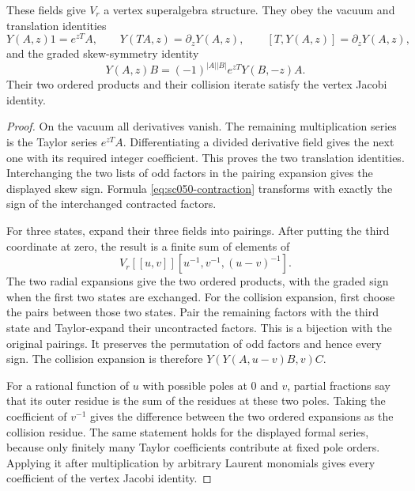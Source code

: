 \begin{proposition}\label{prop:sc050-vertex}
These fields give \(V_r\) a vertex superalgebra structure. They obey
the vacuum and translation identities
\[
 Y(A,z)1=e^{zT}A,\qquad
 Y(TA,z)=\partial_zY(A,z),\qquad
 [T,Y(A,z)]=\partial_zY(A,z),
\]
and the graded skew-symmetry identity
\[
 Y(A,z)B=(-1)^{|A||B|}e^{zT}Y(B,-z)A.
\]
Their two ordered products and their collision iterate satisfy the
vertex Jacobi identity.
\end{proposition}
\begin{proof}
On the vacuum all derivatives vanish. The remaining multiplication
series is the Taylor series \(e^{zT}A\). Differentiating a divided
derivative field gives the next one with its required integer
coefficient. This proves the two translation identities. Interchanging
the two lists of odd factors in the pairing expansion gives the
displayed skew sign. Formula \eqref{eq:sc050-contraction} transforms
with exactly the sign of the interchanged contracted factors.

For three states, expand their three fields into pairings. After
putting the third coordinate at zero, the result is a finite sum of
elements of
\[
 V_r[[u,v]][u^{-1},v^{-1},(u-v)^{-1}].
\]
The two radial expansions give the two ordered products, with the
graded sign when the first two states are exchanged. For the collision
expansion, first choose the pairs between those two states. Pair the
remaining factors with the third state and Taylor-expand their
uncontracted factors. This is a bijection with the original pairings.
It preserves the permutation of odd factors and hence every sign.
The collision expansion is therefore \(Y(Y(A,u-v)B,v)C\).

For a rational function of \(u\) with possible poles at \(0\) and
\(v\), partial fractions say that its outer residue is the sum of the
residues at these two poles. Taking the coefficient of \(v^{-1}\)
gives the difference between the two ordered expansions as the
collision residue. The same statement holds for the displayed formal
series, because only finitely many Taylor coefficients contribute at
fixed pole orders. Applying it after multiplication by arbitrary
Laurent monomials gives every coefficient of the vertex Jacobi
identity.
\end{proof}

